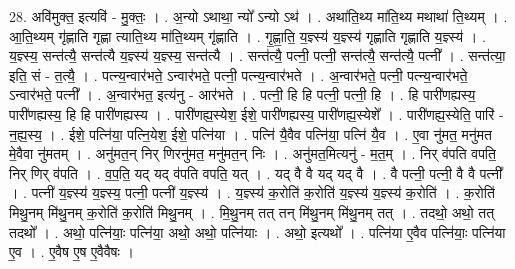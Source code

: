 \documentclass[17pt]{extarticle}
\begin{document}
28. अवि॑मुक्त॒ इत्यवि॑ - मु॒क्तः॒ । . अ॒न्यो ऽथाथा॒ न्यो᳚ ऽन्यो ऽथ॑ । . अथा॑ति॒थ्य मा॑ति॒थ्य मथाथा॑ ति॒थ्यम् । . आ॒ति॒थ्यम् गृ॑ह्णाति गृह्णा त्याति॒थ्य मा॑ति॒थ्यम् गृ॑ह्णाति । . गृ॒ह्णा॒ति॒ य॒ज्ञ्स्य॑ य॒ज्ञ्स्य॑ गृह्णाति गृह्णाति य॒ज्ञ्स्य॑ । . य॒ज्ञ्स्य॒ सन्त॑त्यै॒ सन्त॑त्यै य॒ज्ञ्स्य॑ य॒ज्ञ्स्य॒ सन्त॑त्यै । . सन्त॑त्यै॒ पत्नी॒ पत्नी॒ सन्त॑त्यै॒ सन्त॑त्यै॒ पत्नी᳚ । . सन्त॑त्या॒ इति॒ सं - त॒त्यै॒ । . पत्न्य॒न्वार॑भते॒ ऽन्वार॑भते॒ पत्नी॒ पत्न्य॒न्वार॑भते । . अ॒न्वार॑भते॒ पत्नी॒ पत्न्य॒न्वार॑भते॒ ऽन्वार॑भते॒ पत्नी᳚ । . अ॒न्वार॑भत॒ इत्य॑नु - आर॑भते । . पत्नी॒ हि हि पत्नी॒ पत्नी॒ हि । . हि पारी॑णह्यस्य॒ पारी॑णह्यस्य॒ हि हि पारी॑णह्यस्य । . पारी॑णह्य॒स्येश॒ ईशे॒ पारी॑णह्यस्य॒ पारी॑णह्य॒स्येशे᳚ । . पारी॑णह्य॒स्येति॒ पारि॑ - न॒ह्य॒स्य॒ । . ईशे॒ पत्नि॑या॒ पत्नि॒येश॒ ईशे॒ पत्नि॑या । . पत्नि॑ यै॒वैव पत्नि॑या॒ पत्नि॑ यै॒व । . ए॒वा नु॑मत॒ मनु॑मत मे॒वैवा नु॑मतम् । . अनु॑मत॒न् निर् णिरनु॑मत॒ मनु॑मत॒न् निः । . अनु॑मत॒मित्यनु॑ - म॒त॒म् । . निर् व॑पति वपति॒ निर् णिर् व॑पति । . व॒प॒ति॒ यद् यद् व॑पति वपति॒ यत् । . यद् वै वै यद् यद् वै । . वै पत्नी॒ पत्नी॒ वै वै पत्नी᳚ । . पत्नी॑ य॒ज्ञ्स्य॑ य॒ज्ञ्स्य॒ पत्नी॒ पत्नी॑ य॒ज्ञ्स्य॑ । . य॒ज्ञ्स्य॑ क॒रोति॑ क॒रोति॑ य॒ज्ञ्स्य॑ य॒ज्ञ्स्य॑ क॒रोति॑ । . क॒रोति॑ मिथु॒नम् मि॑थु॒नम् क॒रोति॑ क॒रोति॑ मिथु॒नम् । . मि॒थु॒नम् तत् तन् मि॑थु॒नम् मि॑थु॒नम् तत् । . तदथो॒ अथो॒ तत् तदथो᳚ । . अथो॒ पत्नि॑याः॒ पत्नि॑या॒ अथो॒ अथो॒ पत्नि॑याः । . अथो॒ इत्यथो᳚ । . पत्नि॑या ए॒वैव पत्नि॑याः॒ पत्नि॑या ए॒व । . ए॒वैष ए॒ष ए॒वैवैषः । \newline
\end{document}
